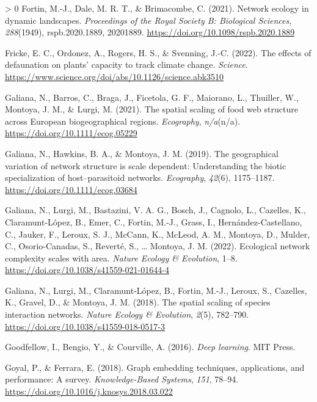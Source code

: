 \documentclass[10pt,oneside]{article}
\newlength{\cslhangindent}
\newenvironment{CSLReferences}[3] %
 {%
  \setlength{\parindent}{0pt}
  \ifodd #1 \everypar{\setlength{\hangindent}{\cslhangindent}}\ignorespaces\fi
  \ifnum #2 > 0
  \setlength{\parskip}{#2\baselineskip}
  \fi
 }%
 {}
\begin{document}
\begin{CSLReferences}{1}{0}
\leavevmode\hypertarget{ref-Fortin2021NetEco}{}%
Fortin, M.-J., Dale, M. R. T., \& Brimacombe, C. (2021). Network ecology
in dynamic landscapes. \emph{Proceedings of the Royal Society B:
Biological Sciences}, \emph{288}(1949), rspb.2020.1889, 20201889.
\url{https://doi.org/10.1098/rspb.2020.1889}

\leavevmode\hypertarget{ref-Fricke2022EffDef}{}%
Fricke, E. C., Ordonez, A., Rogers, H. S., \& Svenning, J.-C. (2022).
The effects of defaunation on plants' capacity to track climate change.
\emph{Science}.
\url{https://www.science.org/doi/abs/10.1126/science.abk3510}

\leavevmode\hypertarget{ref-Galiana2021SpaSca}{}%
Galiana, N., Barros, C., Braga, J., Ficetola, G. F., Maiorano, L.,
Thuiller, W., Montoya, J. M., \& Lurgi, M. (2021). The spatial scaling
of food web structure across European biogeographical regions.
\emph{Ecography}, \emph{n/a}(n/a).
\url{https://doi.org/10.1111/ecog.05229}

\leavevmode\hypertarget{ref-Galiana2019GeoVar}{}%
Galiana, N., Hawkins, B. A., \& Montoya, J. M. (2019). The geographical
variation of network structure is scale dependent: Understanding the
biotic specialization of host--parasitoid networks. \emph{Ecography},
\emph{42}(6), 1175--1187. \url{https://doi.org/10.1111/ecog.03684}

\leavevmode\hypertarget{ref-Galiana2022EcoNet}{}%
Galiana, N., Lurgi, M., Bastazini, V. A. G., Bosch, J., Cagnolo, L.,
Cazelles, K., Claramunt-López, B., Emer, C., Fortin, M.-J., Grass, I.,
Hernández-Castellano, C., Jauker, F., Leroux, S. J., McCann, K., McLeod,
A. M., Montoya, D., Mulder, C., Osorio-Canadas, S., Reverté, S.,
\ldots{} Montoya, J. M. (2022). Ecological network complexity scales
with area. \emph{Nature Ecology \& Evolution}, 1--8.
\url{https://doi.org/10.1038/s41559-021-01644-4}

\leavevmode\hypertarget{ref-Galiana2018SpaSca}{}%
Galiana, N., Lurgi, M., Claramunt-López, B., Fortin, M.-J., Leroux, S.,
Cazelles, K., Gravel, D., \& Montoya, J. M. (2018). The spatial scaling
of species interaction networks. \emph{Nature Ecology \& Evolution},
\emph{2}(5), 782--790. \url{https://doi.org/10.1038/s41559-018-0517-3}

\leavevmode\hypertarget{ref-Goodfellow2016DeeLea}{}%
Goodfellow, I., Bengio, Y., \& Courville, A. (2016). \emph{Deep
learning}. MIT Press.

\leavevmode\hypertarget{ref-Goyal2018GraEmb}{}%
Goyal, P., \& Ferrara, E. (2018). Graph embedding techniques,
applications, and performance: A survey. \emph{Knowledge-Based Systems},
\emph{151}, 78--94. \url{https://doi.org/10.1016/j.knosys.2018.03.022}


\end{CSLReferences}
\end{document}
